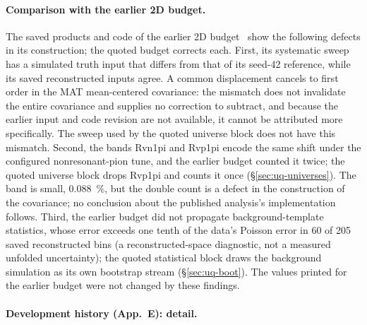 \paragraph{Comparison with the earlier 2D budget.} The saved products and code of the earlier 2D budget~\cite{TwoDFollowup2026} show the following defects in its construction; the quoted budget corrects each. First, its systematic sweep has a simulated truth input that differs from that of its seed-42 reference, while its saved reconstructed inputs agree. A common displacement cancels to first order in the MAT mean-centered covariance: the mismatch does not invalidate the entire covariance and supplies no correction to subtract, and because the earlier input and code revision are not available, it cannot be attributed more specifically. The sweep used by the quoted universe block does not have this mismatch. Second, the bands Rvn1pi and Rvp1pi encode the same shift under the configured nonresonant-pion tune, and the earlier budget counted it twice; the quoted universe block drops Rvp1pi and counts it once (\S\ref{sec:uq-universes}). The band is small, \SI{0.088}{\percent}, but the double count is a defect in the construction of the covariance; no conclusion about the published analysis's implementation follows. Third, the earlier budget did not propagate background-template statistics, whose error exceeds one tenth of the data's Poisson error in 60 of 205 saved reconstructed bins (a reconstructed-space diagnostic, not a measured unfolded uncertainty); the quoted statistical block draws the background simulation as its own bootstrap stream (\S\ref{sec:uq-boot}). The values printed for the earlier budget were not changed by these findings.
%

\paragraph{Development history (App.~E): detail.}

